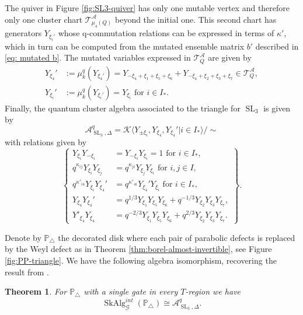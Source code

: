 \documentclass[a4paper]{article}
\numberwithin{equation}{section}
\newtheorem{theorem}[counter]{Theorem}
\newcommand{\1}{{\mathrm{1}\mkern-4mu{\mathchoice{}{}{\mskip-0.5mu}{\mskip-1mu}}\mathrm{l}}}
\newcommand{\PP}{\mathbb{P}}
\DeclareMathOperator{\SL}{SL}
\newcommand{\G}{\mathcal{G}}
\DeclareMathOperator{\SkAlg}{SkAlg}
\begin{document}
The quiver in Figure \ref{fig:SL3-quiver} has only one mutable vertex and therefore only one cluster chart $\mathcal{T}_{\mu_4(Q)}^\mathcal{A}$ beyond the initial one.
This second chart has generators $Y_{\xi_i'}$ whose q-commutation relations can be expressed in terms of $\kappa'$, which in turn can be computed from the mutated ensemble matrix $b'$ described in \eqref{eq: mutated b}. The mutated variables expressed in $\mathcal{T}_Q^{\mathcal{A}}$ are given by 
\begin{equation}
\begin{aligned}
    Y_{\xi_4}'&:= \mu_k^q(Y_{\xi_4'}) = Y_{-\xi_4 + \xi_1 +\xi_5 + \xi_6} + Y_{-\xi_4 + \xi_2 +\xi_3 + \xi_7} \in \mathcal{T}_Q^{\mathcal{A}},\\
    Y_{\xi_i}' &:= \mu_k^q(Y_{\xi_i'}) = Y_{\xi_i} \text{ for } i \in I_\ast .
\end{aligned}
\end{equation}
Finally, the quantum cluster algebra associated to the triangle for $\SL_3$ is given by
\begin{equation}\label{eq: quantum cluster algebra}
     \mathscr{A}^q_{\SL_3, \Delta} = \mathcal{K}\langle Y_{\pm\xi_i}, Y_{\xi_4}, Y_{\xi_4}' | i \in I_\ast\rangle/\sim
\end{equation}
with relations given by
\begin{equation}\label{eq: quantum cluster relations}
\left\{
\begin{aligned}
Y_{\xi_i}Y_{-\xi_i}
&= Y_{-\xi_i}Y_{\xi_i} =1\text{ for } i \in I_\ast,\\
q^{\kappa_{ij}}Y_{\xi_i}Y_{\xi_j}
&= q^{\kappa_{ji}}Y_{\xi_j}Y_{\xi_i} \text{ for } i,j \in I,\\
q^{\kappa'_{i4}}Y_{\xi_i}Y_{\xi_4}'
&= q^{\kappa'_{4i}}Y_{\xi_4}'Y_{\xi_i}\text{ for } i \in I_\ast,\\
Y_{\xi_4}Y_{\xi_4}'
&= q^{1/3}Y_{\xi_1}Y_{\xi_5}Y_{\xi_6}
 + q^{-1/3}Y_{\xi_2}Y_{\xi_3}Y_{\xi_7},\\
 Y'_{\xi_4}Y_{\xi_4} &= q^{-2/3}Y_{\xi_1}Y_{\xi_5}Y_{\xi_6}
 + q^{2/3}Y_{\xi_2}Y_{\xi_3}Y_{\xi_7}.
\end{aligned}
\right\}.
\end{equation}

Denote by $\PP_\triangle$ the decorated disk where each pair of parabolic defects is replaced by the Weyl defect as in Theorem \ref{thm:borel-almost-invertible}, see Figure \ref{fig:PP-triangle}.
We have the following algebra isomorphism, recovering the result from \cite{IY22}.
\begin{theorem}
    For $\PP_\triangle$ with a single gate in every $T$-region we have
    \begin{equation}
        \SkAlg^{int}_{\G}(\PP_\triangle) \cong \mathscr{A}^q_{\SL_3, \Delta}.
    \end{equation}
\end{theorem}
\end{document}
